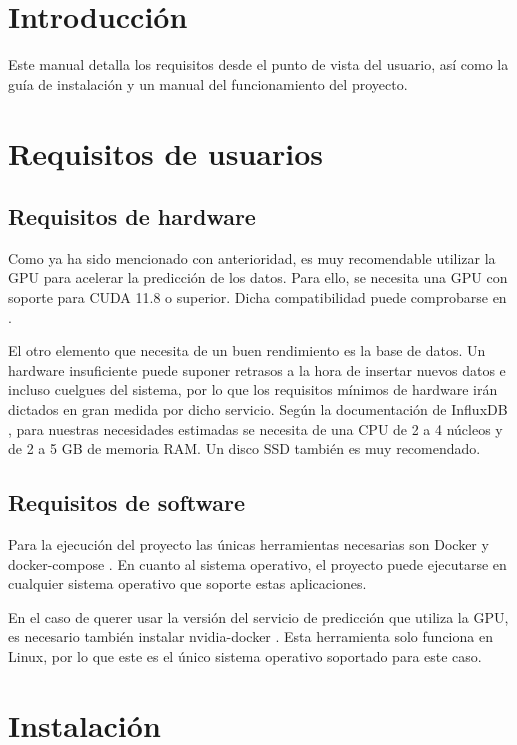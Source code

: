 
\section{Introducción}

Este manual detalla los requisitos desde el punto de vista del usuario, así como la guía de instalación y 
un manual del funcionamiento del proyecto.

\section{Requisitos de usuarios}

\subsection{Requisitos de hardware}
Como ya ha sido mencionado con anterioridad, es muy recomendable utilizar la GPU para acelerar la predicción de 
los datos. Para ello, se necesita una GPU con soporte para CUDA 11.8 o superior. Dicha compatibilidad puede
comprobarse en \cite{cuda-compatibility}.

El otro elemento que necesita de un buen rendimiento es la base de datos. Un hardware insuficiente puede suponer 
retrasos a la hora de insertar nuevos datos e incluso cuelgues del sistema, por lo que los requisitos mínimos de 
hardware irán dictados en gran medida por dicho servicio. Según la documentación de InfluxDB \cite{influx:requirements}, para nuestras necesidades 
estimadas se necesita de una CPU de 2 a 4 núcleos y de 2 a 5 GB de memoria RAM. Un disco SSD también es muy recomendado.

\subsection{Requisitos de software}
Para la ejecución del proyecto las únicas herramientas necesarias son Docker \cite{docker-pag} y docker-compose \cite{compose}.
En cuanto al sistema operativo, el proyecto puede ejecutarse en cualquier sistema operativo que soporte estas aplicaciones.

En el caso de querer usar la versión del servicio de predicción que utiliza la GPU, es necesario también instalar 
nvidia-docker \cite{nvidia-docker}. Esta herramienta solo funciona en Linux, por lo que este es el único sistema 
operativo soportado para este caso.

\section{Instalación}


